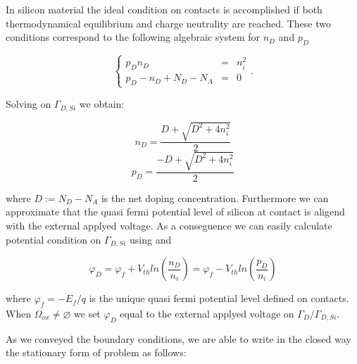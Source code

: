 In silicon material the ideal condition on contacts is accomplished if both thermodynamical equilibrium and charge neutrality are reached. These two conditions correspond to the following algebraic system for $n_D$ and $p_D$

\begin{equation}
\label{eq: systemo for dirichlet condition}
\left\{
\begin{array}{lcl}
p_Dn_D & = &n_i^2 \\
p_D -n_D +N_D-N_A & = & 0 
\end{array}
\right. .
\end{equation}

Solving  on $\Gamma_{D,Si}$ we obtain:

\begin{equation}
n_D = \dfrac{D + \sqrt{D^2+4n_i^2}}{2}
\end{equation}
\begin{equation}
p_D = \dfrac{-D + \sqrt{D^2+4n_i^2}}{2}
\end{equation}

where $D := N_D-N_A$ is the net doping concentration. Furthermore  we can approximate that the quasi fermi potential level of silicon at contact is aligend with the external applyed voltage. As a conseguence we can easily calculate potential condition on $\Gamma_{D,Si}$ using  and 

\begin{equation}
\varphi_D = \varphi_f + V_{th}ln\left( \dfrac{n_D}{n_i} \right) = \varphi_f - V_{th}ln\left( \dfrac{p_D}{n_i} \right)
\end{equation}

where $\varphi_f = - E_f / q$ is the unique quasi fermi potential level defined on contacts. When $\Omega_{ox} \neq \varnothing$ we set $\varphi_D$ equal to the external applyed voltage on $\Gamma_D / \Gamma_{D,Si}$.


As we conveyed the boundary conditions, we are able to write in the closed way the stationary form of problem  as follows:
 

